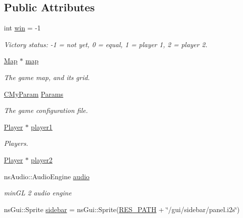 \subsection*{Public Attributes}
\begin{DoxyCompactItemize}
\item 
int \hyperlink{classns_game_1_1_game_state_aa5b4cb6af0e806d442e5291578a6822a}{win} = -\/1
\begin{DoxyCompactList}\small\item\em Victory status\+: -\/1 = not yet, 0 = equal, 1 = player 1, 2 = player 2. \end{DoxyCompactList}\item 
\hyperlink{classns_game_1_1_map}{Map} $\ast$ \hyperlink{classns_game_1_1_game_state_a451982a5efe66e5402402ed0f996fca6}{map}
\begin{DoxyCompactList}\small\item\em The game map, and its grid. \end{DoxyCompactList}\item 
\hyperlink{struct_c_my_param}{C\+My\+Param} \hyperlink{classns_game_1_1_game_state_a972d8482f9ed69d536ff8c7927a8c290}{Params}
\begin{DoxyCompactList}\small\item\em The game configuration file. \end{DoxyCompactList}\item 
\hyperlink{classns_game_1_1_player}{Player} $\ast$ \hyperlink{classns_game_1_1_game_state_aec14e8ba226edc828deabb6e6b276c70}{player1}
\begin{DoxyCompactList}\small\item\em Players. \end{DoxyCompactList}\item 
\hyperlink{classns_game_1_1_player}{Player} $\ast$ \hyperlink{classns_game_1_1_game_state_abd99551650ebb05056576dd2fee40b4b}{player2}
\item 
ns\+Audio\+::\+Audio\+Engine \hyperlink{classns_game_1_1_game_state_a9bd618bc831669e078759402caa0cb78}{audio}
\begin{DoxyCompactList}\small\item\em min\+GL 2 audio engine \end{DoxyCompactList}\item 
ns\+Gui\+::\+Sprite \hyperlink{classns_game_1_1_game_state_a144f7f71a2a43f8422a346e4bc9bb923}{sidebar} = ns\+Gui\+::\+Sprite(\hyperlink{definitions_8h_a793644bd88146828177a2a4f57e3bf01}{R\+E\+S\+\_\+\+P\+A\+TH} + \char`\"{}/gui/sidebar/panel.\+i2s\char`\"{})

\end{DoxyCompactItemize}
